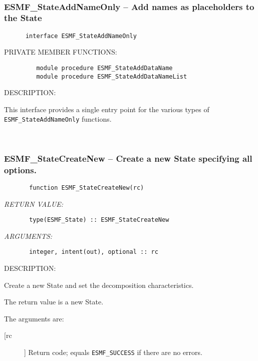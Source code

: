  
\mbox{}\hrulefill\ 
 
\subsubsection{ESMF\_StateAddNameOnly -- Add names as placeholders to the State}


 
\begin{verbatim}      interface ESMF_StateAddNameOnly
 \end{verbatim}{\sf PRIVATE MEMBER FUNCTIONS:}
\begin{verbatim}         module procedure ESMF_StateAddDataName
         module procedure ESMF_StateAddDataNameList
 \end{verbatim}
{\sf DESCRIPTION:\\ }

 
   This interface provides a single entry point for the various 
    types of {\tt ESMF\_StateAddNameOnly} functions.   
     
 
\mbox{}\hrulefill\ 
 
\subsubsection{ESMF\_StateCreateNew -- Create a new State specifying all options.}


 
\begin{verbatim}       function ESMF_StateCreateNew(rc)\end{verbatim}{\em RETURN VALUE:}
\begin{verbatim}       type(ESMF_State) :: ESMF_StateCreateNew\end{verbatim}{\em ARGUMENTS:}
\begin{verbatim}       integer, intent(out), optional :: rc \end{verbatim}
{\sf DESCRIPTION:\\ }


    Create a new State and set the decomposition characteristics.
  
    The return value is a new State.
      
    The arguments are:
    \begin{description}
  
     \item[[rc]]
      Return code; equals {\tt ESMF\_SUCCESS} if there are no errors.
  
     \end{description}
   
